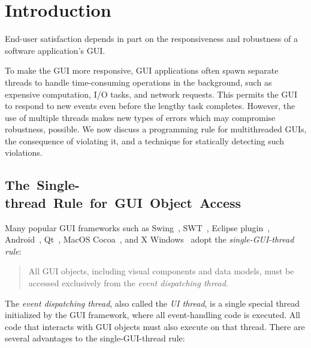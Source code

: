 \section{Introduction}
\label{sec:introduction}

End-user satisfaction depends in part on the responsiveness and
robustness of a software application's GUI.

To make the GUI more responsive, 
GUI applications often spawn separate threads to handle time-consuming
operations in the background, such as expensive computation, I/O tasks,
and network requests. This permits the GUI to respond to new events
even before the lengthy task completes. However, the use of multiple threads
makes new types of errors which may compromise robustness, possible.
We now discuss a programming rule for multithreaded GUIs, the consequence
of violating it, and a technique for statically detecting such violations.



\subsection{\hspace{-1.1ex}\mbox{The}~\mbox{Single-thread}~\mbox{Rule}~\mbox{for}~\mbox{GUI}~\mbox{Object}~\mbox{Access}}

Many popular GUI frameworks such as Swing~\cite{swing}, SWT~\cite{swt}, Eclipse plugin~\cite{eclipse},
Android~\cite{android}, Qt~\cite{qt}, MacOS Cocoa~\cite{macos},
and X Windows~\cite{xwindow}
adopt the \textit{single-GUI-thread rule}:

\vspace{-2mm}

\begin{quote}
All GUI objects, including visual components and data models, must be
 accessed exclusively from the \textit{event dispatching thread}.
\end{quote}

\vspace{-2mm}

The \textit{event dispatching thread}, also called the \textit{UI thread}, is a single
special thread initialized by the GUI framework, where all event-handling code
is executed. All code that interacts with GUI objects must also
execute on that thread.  There are several advantages to the single-GUI-thread rule:

